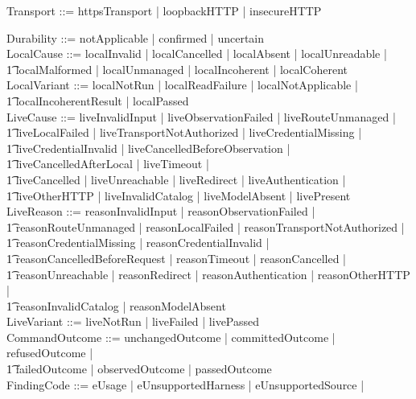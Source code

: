 \documentclass{article}
\begin{document}
\begin{zed}
	Transport ::= httpsTransport | loopbackHTTP | insecureHTTP
\end{zed}

\begin{zed}
	Durability ::= notApplicable | confirmed | uncertain \\
	LocalCause ::= localInvalid | localCancelled | localAbsent | localUnreadable | \\
	\t1 localMalformed | localUnmanaged | localIncoherent | localCoherent \\
	LocalVariant ::= localNotRun | localReadFailure | localNotApplicable | \\
	\t1 localIncoherentResult | localPassed \\
	LiveCause ::= liveInvalidInput | liveObservationFailed | liveRouteUnmanaged | \\
	\t1 liveLocalFailed | liveTransportNotAuthorized | liveCredentialMissing | \\
	\t1 liveCredentialInvalid | liveCancelledBeforeObservation | \\
	\t1 liveCancelledAfterLocal | liveTimeout | \\
	\t1 liveCancelled | liveUnreachable | liveRedirect | liveAuthentication | \\
	\t1 liveOtherHTTP | liveInvalidCatalog | liveModelAbsent | livePresent \\
	LiveReason ::= reasonInvalidInput | reasonObservationFailed | \\
	\t1 reasonRouteUnmanaged | reasonLocalFailed | reasonTransportNotAuthorized | \\
	\t1 reasonCredentialMissing | reasonCredentialInvalid | \\
	\t1 reasonCancelledBeforeRequest | reasonTimeout | reasonCancelled | \\
	\t1 reasonUnreachable | reasonRedirect | reasonAuthentication | reasonOtherHTTP | \\
	\t1 reasonInvalidCatalog | reasonModelAbsent \\
	LiveVariant ::= liveNotRun | liveFailed | livePassed \\
	CommandOutcome ::= unchangedOutcome | committedOutcome | refusedOutcome | \\
	\t1 failedOutcome | observedOutcome | passedOutcome \\
	FindingCode ::= eUsage | eUnsupportedHarness | eUnsupportedSource | \\

\end{zed}
\end{document}
